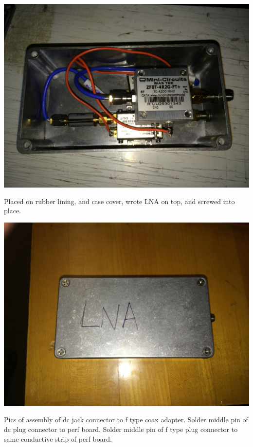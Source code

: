 \documentclass[11pt]{article} %
\begin{document}
\begin{center}
\includegraphics[scale=0.12]{lna/06.jpeg}
\end{center}

Placed on rubber lining, and case cover, wrote LNA on top, and screwed into place. 

\begin{center}
\includegraphics[scale=0.12]{lna/07.jpeg}
\end{center}

Pics of assembly of dc jack connector to f type coax adapter.
Solder middle pin of dc plug connector to perf board.
Solder middle pin of f type plug connector to same conductive strip of perf board. 
\end{document}

